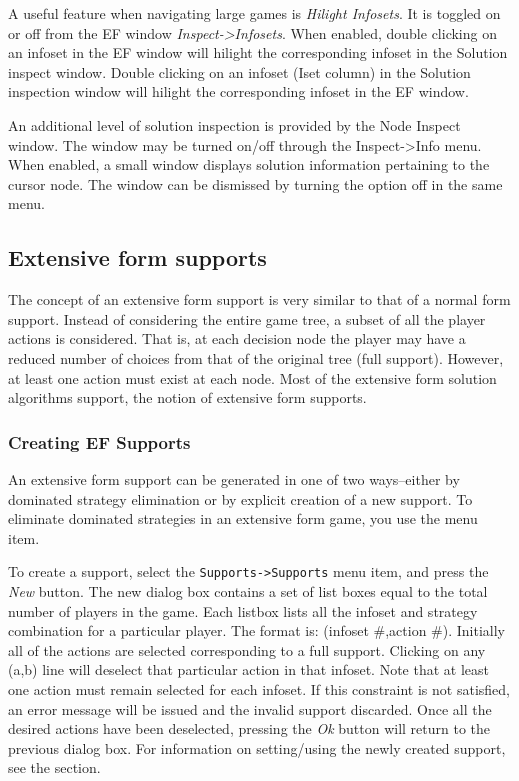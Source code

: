 {A useful feature when navigating large games is {\em Hilight Infosets}.  It is 
toggled on or off 
from the EF window {\em Inspect->Infosets}.  When enabled, double clicking on an
infoset in the EF window will hilight the corresponding infoset in the Solution inspect
window.  Double clicking on an infoset (Iset column) in the Solution inspection window
will hilight the corresponding infoset in the EF window.

An additional level of solution inspection is provided by the Node Inspect
window.  The window may be turned on/off through the Inspect->Info menu. When
enabled, a small window displays solution information pertaining to the cursor
node.  The window can be dismissed by turning the option off in the same menu.

\subsection{Extensive form supports}
The concept of an extensive form support is very similar to that of a normal form support.
Instead of considering the entire game tree, a subset of all the player actions is considered.
That is, at each decision node the player may have a reduced number of choices from that of
the original tree (full support).  However, at least one action must exist at each node.  Most 
of the extensive form solution algorithms support, the notion of extensive form supports.  

\subsubsection{Creating EF Supports}
An extensive form support can be generated in one of two ways--either by 
dominated strategy elimination or by explicit creation of a new support.  
To eliminate dominated strategies in an extensive form game, you use the 
 menu item.  

To create a support, select the {\tt Supports->Supports} menu item, 
and press the {\em New} button.
The new dialog box contains a set of list boxes equal to the total number of players in the
game.  Each listbox lists all the infoset and strategy combination for a particular player.
The format is: (infoset #,action #).  Initially all of the actions are selected corresponding
to a full support.  Clicking on any (a,b) line will deselect that particular action in that
infoset.  Note that at least one action must remain selected for each infoset.  If this 
constraint is not satisfied, an error message will be issued and the invalid support discarded.
Once all the desired actions have been deselected, pressing the {\em Ok} button will return
to the previous dialog box.  For information on setting/using the newly created support, see
the  section.

}
